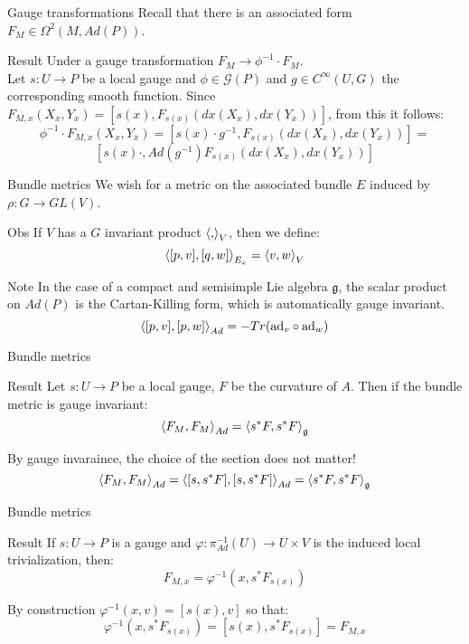 \documentclass{beamer}
\begin{document}
\begin{frame}{Gauge transformations}
	Recall that there is an associated form $F_M\in\Omega^2(M,Ad(P))$.
	\begin{block}{Result}
		Under a gauge transformation $F_M\rightarrow \phi^{-1}\cdot F_M$.
		\\\vspace{9 pt}
		Let $s:U\rightarrow P$ be a local gauge and $\phi\in \mathcal{G}(P)$ and $g\in C^\infty(U,G)$ the corresponding smooth function. Since $F_{M,x}(X_x,Y_x)=[s(x),F_{s(x)}(dx(X_x),dx(Y_x))]$, from this it follows:
		$$\phi^{-1}\cdot F_{M,x}(X_x,Y_x)=[s(x)\cdot g^{-1},F_{s(x)}(dx(X_x),dx(Y_x))]=$$$$[s(x)\cdot ,Ad(g^{-1})F_{s(x)}(dx(X_x),dx(Y_x))]$$
	\end{block}
\end{frame}
\begin{frame}{Bundle metrics}
	We wish for a metric on the associated bundle $E$ induced by $\rho:G\rightarrow GL(V)$.
	\begin{exampleblock}{Obs}
		If $V$ has a $G$ invariant product $\braket{,}_V$, then we define:
		$$\braket{[p,v],[q,w]}_{E_x}=\braket{v,w}_V$$
	\end{exampleblock}
	\begin{alertblock}{Note}
		In the case of a compact and semisimple Lie algebra $\mathfrak{g}$, the scalar product on $Ad(P)$ is the Cartan-Killing form, which is automatically gauge invariant.
		$$\braket{[p,v],[p,w]}_{Ad}=-Tr(\hbox{ad}_v\circ \hbox{ad}_w)$$
	\end{alertblock}
\end{frame}
\begin{frame}{Bundle metrics}
	\begin{block}{Result}
		Let $s:U\rightarrow P$ be a local gauge, $F$ be the curvature of $A$. Then if the bundle metric is gauge invariant:
		$$\braket{F_M,F_M}_{Ad}=\braket{s^*F,s^*F}_\mathfrak{g}$$
	\end{block}
	By gauge invaraince, the choice of the section does not matter!
	\\
	$$\braket{F_M,F_M}_{Ad}=\braket{[s,s^*F],[s,s^*F]}_{Ad}=\braket{s^*F,s^*F}_\mathfrak{g}$$
\end{frame}
\begin{frame}{Bundle metrics}
	\begin{block}{Result}
		If $s:U\rightarrow P$ is a gauge and $\varphi:\pi_{Ad}^{-1}(U)\rightarrow U\times V$ is the induced local trivialization, then:
		$$F_{M,x}=\varphi^{-1}(x,s^*F_{s(x)})$$
	\end{block}
	By construction $\varphi^{-1}(x,v)=[s(x),v]$ so that:
	$$\varphi^{-1}(x,s^*F_{s(x)})=[s(x),s^*F_{s(x)}]=F_{M,x}$$
\end{frame}
\end{document}
